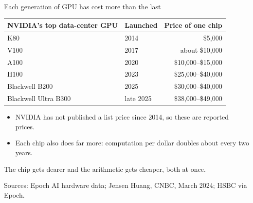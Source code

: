 \documentclass[aspectratio=169,11pt]{beamer}
\begin{document}
\begin{frame}{Each generation of GPU has cost more than the last}

\begin{center}
\footnotesize
\begin{tabular}{@{}llr@{}}
\toprule
\textbf{NVIDIA's top data-center GPU} & \textbf{Launched} & \textbf{Price of one chip} \\
\midrule
K80 & 2014 & \$5,000 \\
V100 & 2017 & about \$10,000 \\
A100 & 2020 & \$10,000--\$15,000 \\
H100 & 2023 & \$25,000--\$40,000 \\
Blackwell B200 & 2025 & \$30,000--\$40,000 \\
Blackwell Ultra B300 & late 2025 & \$38,000--\$49,000 \\
\bottomrule
\end{tabular}
\end{center}

\vspace{0.3cm}

\begin{itemize}\setlength\itemsep{0.3em}
    \item NVIDIA has not published a list price since 2014, so these are reported prices.
    \item Each chip also does far more: computation per dollar doubles about every two years.
\end{itemize}

\vspace{0.25cm}

\alert{The chip gets dearer and the arithmetic gets cheaper, both at once.}

\vspace{0.05cm}
{\scriptsize\color{warmgray}Sources: Epoch AI hardware data; Jensen Huang, CNBC, March 2024; HSBC via Epoch.}

\end{frame}
\end{document}
